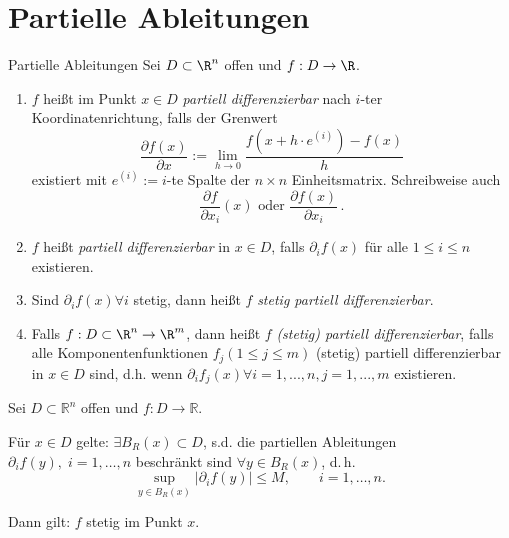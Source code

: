 \section{Partielle Ableitungen}
\label{4.1}

\begin{definition}{Partielle Ableitungen}
    Sei $D \subset \R^n$ offen und $f : D \to \R$.
    \begin{enumerate}
        \item $f$ heißt im Punkt $x \in D$ \emph{partiell differenzierbar} nach $i$-ter Koordinatenrichtung, falls der Grenwert
        $$
            \frac{\partial f(x)}{\partial x} := \lim_{h \to 0} \frac{f\left(x + h \cdot e^{(i)}\right) - f(x)}{h}
        $$
        existiert mit $e^{(i)} := i$-te Spalte der $n\times n$ Einheitsmatrix. Schreibweise auch 
        $$
            \frac{\partial f}{\partial x_i}(x) \text{ oder } \frac{\partial f(x)}{\partial x_i} \,.
        $$
        
        \item $f$ heißt \emph{partiell differenzierbar} in $x \in D$, falls $\partial_i f(x)$ für alle $1 \leq i \leq n$ existieren.
        \item Sind $\partial_i f(x) \forall i$ stetig, dann heißt $f$ \emph{stetig partiell differenzierbar}.
        \item Falls $f : D \subset \R^n \to \R^m$, dann heißt $f$ \emph{(stetig) partiell differenzierbar}, falls alle Komponentenfunktionen $f_j (1 \leq j \leq m)$ (stetig) partiell differenzierbar in $x \in D$ sind, d.h. wenn $\partial_i f_j(x)\forall i = 1, . . . , n, j = 1, . . . , m$ existieren.
    \end{enumerate}
\end{definition}

\begin{satz}{}
    Sei $D\subset\mathbb{R}^n$ offen und $f: D\to\mathbb{R}$.

    Für $x\in D$ gelte: $\exists B_R(x)\subset D$, s.d. die partiellen Ableitungen $\partial_i f(y),\; i=1,\dots,n$ beschränkt sind $\forall y\in B_R(x)$, d.\,h.
    $$
    \sup_{y\in B_R(x)} \lvert \partial_i f(y)\rvert \le M,\qquad i=1,\dots,n.
    $$

    Dann gilt: $f$ stetig im Punkt $x$.
\end{satz}

